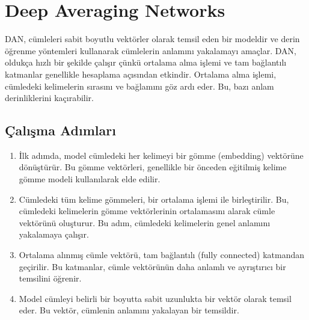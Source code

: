 \section{Deep Averaging Networks}

DAN, cümleleri sabit boyutlu vektörler olarak temsil eden bir modeldir ve derin öğrenme yöntemleri kullanarak cümlelerin anlamını yakalamayı amaçlar. DAN, oldukça hızlı bir şekilde çalışır çünkü ortalama alma işlemi ve tam bağlantılı katmanlar genellikle hesaplama açısından etkindir. Ortalama alma işlemi, cümledeki kelimelerin sırasını ve bağlamını göz ardı eder. Bu, bazı anlam derinliklerini kaçırabilir.

\subsection{Çalışma Adımları}

\begin{enumerate}
    \item İlk adımda, model cümledeki her kelimeyi bir gömme (embedding) vektörüne dönüştürür. Bu gömme vektörleri, genellikle bir önceden eğitilmiş kelime gömme modeli kullanılarak elde edilir.
    \item Cümledeki tüm kelime gömmeleri, bir ortalama işlemi ile birleştirilir. Bu, cümledeki kelimelerin gömme vektörlerinin ortalamasını alarak cümle vektörünü oluşturur. Bu adım, cümledeki kelimelerin genel anlamını yakalamaya çalışır.
    \item Ortalama alınmış cümle vektörü, tam bağlantılı (fully connected) katmandan geçirilir. Bu katmanlar, cümle vektörünün daha anlamlı ve ayrıştırıcı bir temsilini öğrenir. 
    \item Model cümleyi belirli bir boyutta sabit uzunlukta bir vektör olarak temsil eder. Bu vektör, cümlenin anlamını yakalayan bir temsildir.
\end{enumerate}

\newpage